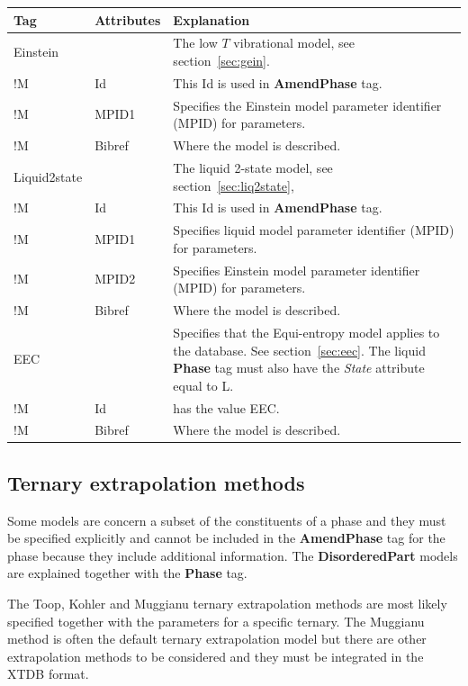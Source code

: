 \documentclass{article}
\begin{document}
\bigskip
\begin{tabular}{|p{} p{} p{}|}\hline
  Tag & Attributes & Explanation\\\hline

  Einstein & & The low $T$ vibrational model, see section~\ref{sec:gein}.\\
!M      & Id & This Id is used in {\bf AmendPhase} tag.\\
!M      & MPID1 & Specifies the Einstein model parameter identifier (MPID)
          for parameters.\\
!M      & Bibref & Where the model is described.\\\hline

  Liquid2state & & The liquid 2-state model, see section~\ref{sec:liq2state},\\
!M      & Id & This Id is used in {\bf AmendPhase} tag.\\
!M      & MPID1 & Specifies liquid model parameter identifier (MPID)
         for parameters.\\
!M      & MPID2 & Specifies Einstein model parameter identifier (MPID)
         for parameters.\\
!M      & Bibref & Where the model is described.\\\hline

  EEC & & Specifies that the Equi-entropy model applies to the database.
          See section~\ref{sec:eec}.  The liquid 
         {\bf Phase} tag must also have the {\em State} attribute equal to L. \\
!M      & Id     & has the value EEC.\\
!M      & Bibref & Where the model is described.\\\hline
\end{tabular}

\newpage

\subsection{Ternary extrapolation methods}\label{sec:toop}

Some models are concern a subset of the constituents of a phase and
they must be specified explicitly and cannot be included in the {\bf
  AmendPhase} tag for the phase because they include additional
information.  The {\bf DisorderedPart} 
models are explained together with the {\bf Phase} tag.

The Toop, Kohler and Muggianu ternary extrapolation methods are most
likely specified together with the parameters for a specific ternary.
The Muggianu method is often the default ternary extrapolation model
but there are other extrapolation methods to be considered and they
must be integrated in the XTDB format.
\end{document}
